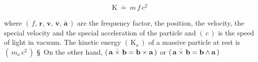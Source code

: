 \documentclass[10pt,fleqn]{article}
\begin{document}
\vspace{-0.30em}
\begin{eqnarray*}
\mathrm{K} ~\doteq~ m \, f \, c^2
\end{eqnarray*}
\par \vspace{+0.90em}
\noindent where $( \, f, \, \mathbf{r}, \, \mathbf{v}, \, \bar{\mathbf{v}}, \, \bar{\mathbf{a}} \, )$ are the frequency factor, the position, the velocity, the special velocity and the special acceleration of the particle and $( \, c \, )$ is the speed of light in vacuum. The kinetic energy $( \, \mathrm{K}_o \, )$ of a massive particle at rest is $( \, m_o \, c^2 \, )$ \S \ On the other hand, {\small $( \, \mathbf{a} \hspace{+0.24em}\dot{\times}\hspace{+0.30em} \mathbf{b} = \mathbf{b} \times \mathbf{a} \, )$} or {\small $( \, \mathbf{a} \hspace{+0.24em}\dot{\times}\hspace{+0.30em} \mathbf{b} = \mathbf{b} \wedge \mathbf{a} \, )$}

\newpage
\end{document}
